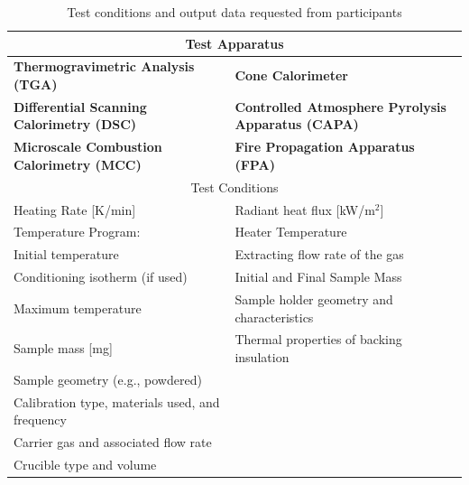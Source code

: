\documentclass{book}
\begin{document}
\begin{table}[ht]
\caption{Test conditions and output data requested from participants}
\label{Table:Tests_Performed}
\begin{center}
\begin{tabular}{ll}
\hline
\multicolumn{2}{c}{Test Apparatus}                                                                       \\ \hline
 \textbf{Thermogravimetric Analysis (TGA)}         &  \textbf{Cone Calorimeter}              \\
 \textbf{Differential Scanning Calorimetry (DSC)} &  \textbf{Controlled Atmosphere Pyrolysis Apparatus (CAPA)}                                     \\
 \textbf{Microscale Combustion Calorimetry (MCC)}                  &  \textbf{Fire Propagation Apparatus (FPA)}     \\
\hline
\multicolumn{2}{c}{Test Conditions}                                                                      \\ \hline
Heating Rate [K/min]                              & Radiant heat flux [kW/m$^2$]                        \\
Temperature Program:                              & Heater Temperature                                   \\
\hspace{.1in} Initial temperature                 & Extracting flow rate of the gas                      \\
\hspace{.1in} Conditioning isotherm (if used)     & Initial and Final Sample Mass                        \\
\hspace{.1in} Maximum temperature                 & Sample holder geometry and characteristics           \\
Sample mass [mg]                                  & Thermal properties of backing insulation             \\
Sample geometry (e.g., powdered)                  &                                                      \\
Calibration type, materials used, and frequency   &                                                      \\
Carrier gas and associated flow rate              &                                                      \\
Crucible type and volume                          &                                                      \\

\end{tabular}
\end{center}
\end{table}
\end{document}
